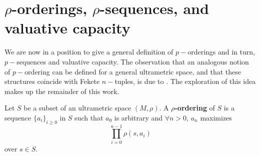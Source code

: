 


\section*{$\rho$-orderings, $\rho$-sequences, and valuative capacity}

We are now in a position to give a general definition of $p-$orderings and in turn, $p-$sequences and valuative capacity. The observation that an analogous notion of $p-$ordering can be defined for a general ultrametric space, and that these structures coincide with Fekete $n-$tuples, is due to \cite{kj}. The exploration of this idea makes up the remainder of this work. \\ 

\begin{definition}
	\cite{kj} Let $S$ be a subset of an ultrametric space $(M,\rho)$. A \textbf{$\rho$-ordering} of $S$ is a sequence $\{a_i\}_{i \geq 0}$ in $S$ such that $a_0$ is arbitrary and $\forall n > 0$, $a_n$ maximizes \[\prod_{i=0}^{n-1} \rho(s,a_i)\] over $s \in S$. 
\end{definition}

